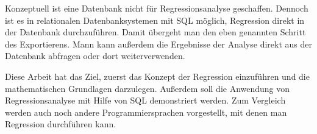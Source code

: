 Konzeptuell ist eine Datenbank nicht für Regressionsanalyse geschaffen. Dennoch ist es in relationalen Datenbanksystemen mit SQL möglich, Regression direkt in der Datenbank durchzuführen. Damit übergeht man den eben genannten Schritt des Exportierens. Mann kann außerdem die Ergebnisse der Analyse direkt aus der Datenbank abfragen oder dort weiterverwenden.

Diese Arbeit hat das Ziel, zuerst das Konzept der Regression einzuführen und die mathematischen Grundlagen darzulegen. Außerdem soll die Anwendung von Regressionsanalyse mit Hilfe von SQL demonstriert werden. Zum Vergleich werden auch noch andere Programmiersprachen vorgestellt, mit denen man Regression durchführen kann.
